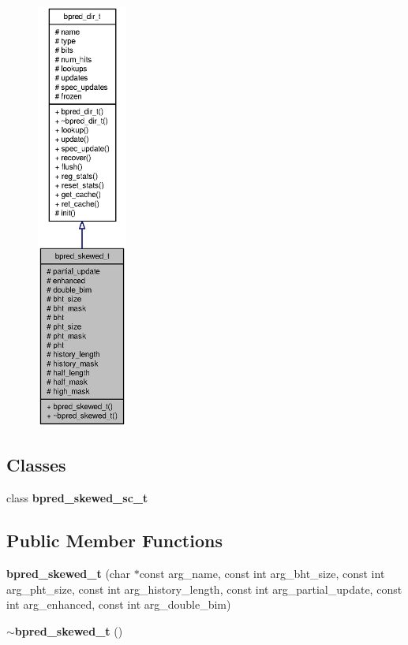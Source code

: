 \begin{figure}[H]
\begin{center}
\leavevmode
\includegraphics[height=400pt]{classbpred__skewed__t__coll__graph}
\end{center}
\end{figure}
\subsection*{Classes}
\begin{CompactItemize}
\item 
class {\bf bpred\_\-skewed\_\-sc\_\-t}
\end{CompactItemize}
\subsection*{Public Member Functions}
\begin{CompactItemize}
\item 
{\bf bpred\_\-skewed\_\-t} (char $\ast$const arg\_\-name, const int arg\_\-bht\_\-size, const int arg\_\-pht\_\-size, const int arg\_\-history\_\-length, const int arg\_\-partial\_\-update, const int arg\_\-enhanced, const int arg\_\-double\_\-bim)
\item 
{\bf $\sim$bpred\_\-skewed\_\-t} ()
\end{CompactItemize}
